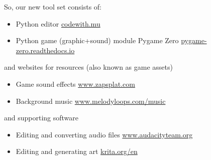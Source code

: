 \documentclass{coderdojo}
\def\pygameZero{{\pygameZeroFont Pygame Zero}}
\begin{document}
So, our new tool set consists of:
\begin{itemize}
\item Python editor \hfill\href{https://codewith.mu}{codewith.mu}
\item Python game (graphic+sound) module \pygameZero\hfill
\href{https://pygame-zero.readthedocs.io/en/stable/}{pygame-zero.readthedocs.io}
\end{itemize}
and websites for resources (also known as game assets)
\begin{itemize}
\item Game sound effects \hfill\href{https://www.zapsplat.com}{www.zapsplat.com}
\item Background music \hfill\href{https://www.melodyloops.com/music/}{www.melodyloops.com/music}
\end{itemize}
and supporting software 
\begin{itemize}
\item Editing and converting audio files \hfill\href{https://www.audacityteam.org}{www.audacityteam.org}
\item Editing and generating art \hfill\href{https://krita.org/en/}{krita.org/en}
\end{itemize}

% 
%
%
%


\end{document}
